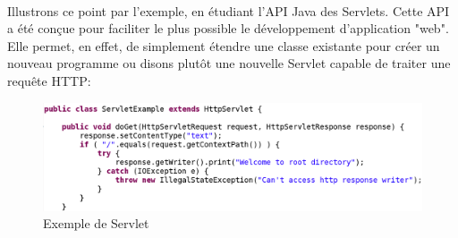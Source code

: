 {  \paragraph{} Illustrons ce point par l'exemple, en étudiant l'API Java des Servlets. Cette API a
  été conçue pour faciliter le plus possible le développement d'application "web". Elle permet, en
  effet, de simplement étendre une classe existante pour créer un nouveau programme ou disons
  plutôt une nouvelle Servlet capable de traiter une requête HTTP:

  \begin{figure}[hb]
    \begin{center}
      \includegraphics[scale=0.25]{img/servlet-api-tour.png}
      \caption{Exemple de Servlet}
      \label{servlet-demo}
    \end{center}
  \end{figure}
}


